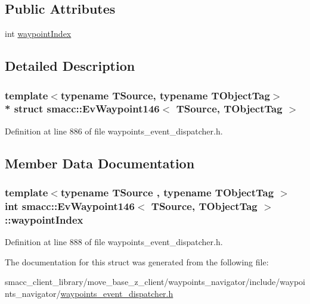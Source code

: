 \subsection*{Public Attributes}
\begin{DoxyCompactItemize}
\item 
int \hyperlink{structsmacc_1_1EvWaypoint146_a58453dca4ba9ed457572ac5aec53dd67}{waypoint\+Index}
\end{DoxyCompactItemize}


\subsection{Detailed Description}
\subsubsection*{template$<$typename T\+Source, typename T\+Object\+Tag$>$\\*
struct smacc\+::\+Ev\+Waypoint146$<$ T\+Source, T\+Object\+Tag $>$}



Definition at line 886 of file waypoints\+\_\+event\+\_\+dispatcher.\+h.



\subsection{Member Data Documentation}
\subsubsection[{\texorpdfstring{waypoint\+Index}{waypointIndex}}]{\setlength{\rightskip}{0pt plus 5cm}template$<$typename T\+Source , typename T\+Object\+Tag $>$ int {\bf smacc\+::\+Ev\+Waypoint146}$<$ T\+Source, T\+Object\+Tag $>$\+::waypoint\+Index}\hypertarget{structsmacc_1_1EvWaypoint146_a58453dca4ba9ed457572ac5aec53dd67}{}\label{structsmacc_1_1EvWaypoint146_a58453dca4ba9ed457572ac5aec53dd67}


Definition at line 888 of file waypoints\+\_\+event\+\_\+dispatcher.\+h.



The documentation for this struct was generated from the following file\+:\begin{DoxyCompactItemize}
\item 
smacc\+\_\+client\+\_\+library/move\+\_\+base\+\_\+z\+\_\+client/waypoints\+\_\+navigator/include/waypoints\+\_\+navigator/\hyperlink{waypoints__event__dispatcher_8h}{waypoints\+\_\+event\+\_\+dispatcher.\+h}\end{DoxyCompactItemize}
